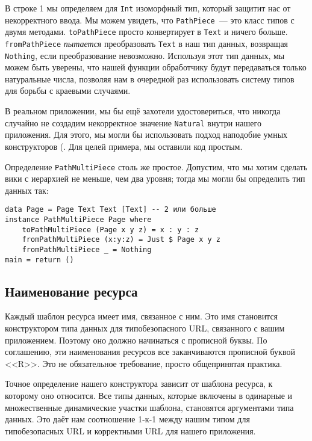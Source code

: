 В строке 1 мы определяем для \lstinline!Int! изоморфный тип, который
защитит нас от некорректного ввода. Мы можем увидеть, что
\lstinline!PathPiece!~--- это класс типов с двумя
методами. \lstinline!toPathPiece! просто конвертирует в
\lstinline!Text! и ничего больше. \lstinline!fromPathPiece!
\emph{пытается} преобразовать \lstinline!Text! в наш тип данных,
возвращая \lstinline!Nothing!, если преобразование
невозможно. Используя этот тип данных, мы можем быть уверены, что
нашей функции обработчику будут передаваться только натуральные числа,
позволяя нам в очередной раз использовать систему типов для борьбы с
краевыми случаями.

\begin{remark}
В реальном приложении, мы бы ещё захотели удостовериться, что никогда
случайно не создадим некорректное значение \lstinline!Natural! внутри
нашего приложения. Для этого, мы могли бы использовать подход
наподобие умных конструкторов
(.
Для целей примера, мы оставили код простым.
\end{remark}

Определение \lstinline!PathMultiPiece! столь же простое. Допустим,
что мы хотим сделать вики с иерархией не меньше, чем два уровня;
тогда мы могли бы определить тип данных так:
\begin{lstlisting}
data Page = Page Text Text [Text] -- 2 или больше
instance PathMultiPiece Page where
    toPathMultiPiece (Page x y z) = x : y : z
    fromPathMultiPiece (x:y:z) = Just $ Page x y z
    fromPathMultiPiece _ = Nothing
main = return ()
\end{lstlisting}%

\subsection{Наименование ресурса}
Каждый шаблон ресурса имеет имя, связанное с ним. Это имя становится
конструктором типа данных для типобезопасного URL, связанного с вашим
приложением. Поэтому оно должно начинаться с прописной буквы. По
соглашению, эти наименования ресурсов все заканчиваются прописной
буквой <<R>>. Это не обязательное требование, просто общепринятая
практика.

Точное определение нашего конструктора зависит от шаблона ресурса, к
которому оно относится. Все типы данных, которые включены в одинарные
и множественные динамические участки шаблона, становятся аргументами
типа данных. Это даёт нам соотношение 1-к-1 между нашим типом для
типобезопасных URL и корректными URL для нашего приложения.

